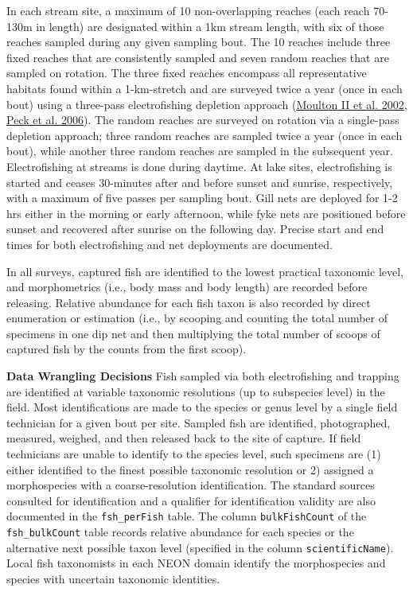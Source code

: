 \documentclass[
  12pt,
]{article}
\begin{document}
In each stream site, a maximum of 10 non-overlapping reaches (each reach 70-130m in length) are designated within a 1km stream length, with six of those reaches sampled during any given sampling bout. The 10 reaches include three fixed reaches that are consistently sampled and seven random reaches that are sampled on rotation. The three fixed reaches encompass all representative habitats found within a 1-km-stretch and are surveyed twice a year (once in each bout) using a three-pass electrofishing depletion approach (\protect\hyperlink{ref-moulton2002revised}{Moulton II et al. 2002}, \protect\hyperlink{ref-peck2006environmental}{Peck et al. 2006}). The random reaches are surveyed on rotation via a single-pass depletion approach; three random reaches are sampled twice a year (once in each bout), while another three random reaches are sampled in the subsequent year. Electrofishing at streams is done during daytime. At lake sites, electrofishing is started and ceases 30-minutes after and before sunset and sunrise, respectively, with a maximum of five passes per sampling bout. Gill nets are deployed for 1-2 hrs either in the morning or early afternoon, while fyke nets are positioned before sunset and recovered after sunrise on the following day. Precise start and end times for both electrofishing and net deployments are documented.

In all surveys, captured fish are identified to the lowest practical taxonomic level, and morphometrics (i.e., body mass and body length) are recorded before releasing. Relative abundance for each fish taxon is also recorded by direct enumeration or estimation (i.e., by scooping and counting the total number of specimens in one dip net and then multiplying the total number of scoops of captured fish by the counts from the first scoop).

\textbf{Data Wrangling Decisions} Fish sampled via both electrofishing and trapping are identified at variable taxonomic resolutions (up to subspecies level) in the field. Most identifications are made to the species or genus level by a single field technician for a given bout per site. Sampled fish are identified, photographed, measured, weighed, and then released back to the site of capture. If field technicians are unable to identify to the species level, such specimens are (1) either identified to the finest possible taxonomic resolution or 2) assigned a morphospecies with a coarse-resolution identification. The standard sources consulted for identification and a qualifier for identification validity are also documented in the \texttt{fsh\_perFish} table. The column \texttt{bulkFishCount} of the \texttt{fsh\_bulkCount} table records relative abundance for each species or the alternative next possible taxon level (specified in the column \texttt{scientificName}). Local fish taxonomists in each NEON domain identify the morphospecies and species with uncertain taxonomic identities.
\end{document}
